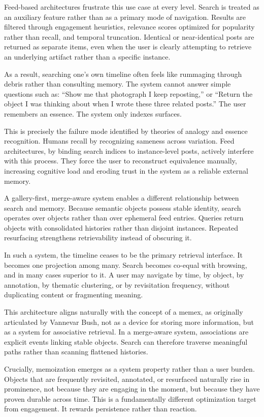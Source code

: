 \documentclass[11pt,oneside]{article}
\begin{document}
Feed-based architectures frustrate this use case at every level. Search is treated as an auxiliary feature rather than as a primary mode of navigation. Results are filtered through engagement heuristics, relevance scores optimized for popularity rather than recall, and temporal truncation. Identical or near-identical posts are returned as separate items, even when the user is clearly attempting to retrieve an underlying artifact rather than a specific instance.

As a result, searching one’s own timeline often feels like rummaging through debris rather than consulting memory. The system cannot answer simple questions such as: “Show me that photograph I keep reposting,” or “Return the object I was thinking about when I wrote these three related posts.” The user remembers an essence. The system only indexes surfaces.

This is precisely the failure mode identified by theories of analogy and essence recognition. Humans recall by recognizing sameness across variation. Feed architectures, by binding search indices to instance-level posts, actively interfere with this process. They force the user to reconstruct equivalence manually, increasing cognitive load and eroding trust in the system as a reliable external memory.

A gallery-first, merge-aware system enables a different relationship between search and memory. Because semantic objects possess stable identity, search operates over objects rather than over ephemeral feed entries. Queries return objects with consolidated histories rather than disjoint instances. Repeated resurfacing strengthens retrievability instead of obscuring it.

In such a system, the timeline ceases to be the primary retrieval interface. It becomes one projection among many. Search becomes co-equal with browsing, and in many cases superior to it. A user may navigate by time, by object, by annotation, by thematic clustering, or by revisitation frequency, without duplicating content or fragmenting meaning.

This architecture aligns naturally with the concept of a memex, as originally articulated by Vannevar Bush, not as a device for storing more information, but as a system for associative retrieval. In a merge-aware system, associations are explicit events linking stable objects. Search can therefore traverse meaningful paths rather than scanning flattened histories.

Crucially, memoization emerges as a system property rather than a user burden. Objects that are frequently revisited, annotated, or resurfaced naturally rise in prominence, not because they are engaging in the moment, but because they have proven durable across time. This is a fundamentally different optimization target from engagement. It rewards persistence rather than reaction.
\end{document}
